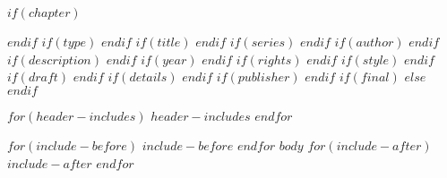 $if(chapter)$
\setcounter{chapter}{$chapter$}
\addtocounter{chapter}{-1}
$endif$
$if(type)$
\renewcommand{\bookgentype}{$type$}
$endif$
$if(title)$
\renewcommand{\titleinfo}{$title$}
$endif$
$if(series)$
\renewcommand{\seriesinfo}{$series$}
$endif$
$if(author)$
\renewcommand{\authorinfo}{$author$}
$endif$
$if(description)$
\renewcommand{\descriptioninfo}{$description$}
$endif$
$if(year)$
\renewcommand{\yearinfo}{$year$}
$endif$
$if(rights)$
\renewcommand{\rightsinfo}{$rights$}
$endif$
$if(style)$
\renewcommand{\editioninfo}{\capitalisewords{$style$}}
$endif$
$if(draft)$
\renewcommand{\draftinfo}{$draft$}
$endif$
$if(details)$
\renewcommand{\detailsinfo}{$details$}
$endif$
$if(publisher)$
\renewcommand{\publisherinfo}{$publisher$}
$endif$
$if(final)$
\DraftOff
$else$
\DraftOn
$endif$

$for(header-includes)$
$header-includes$
$endfor$

$for(include-before)$
$include-before$
$endfor$
$body$
$for(include-after)$
$include-after$
$endfor$
